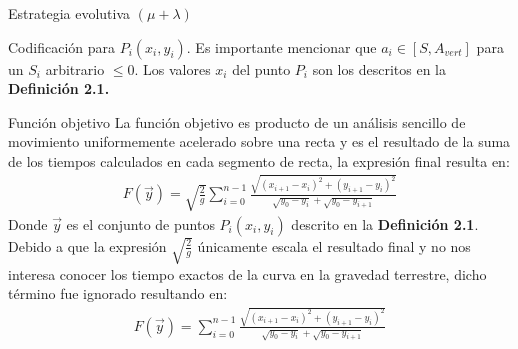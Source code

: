 \documentclass[10pt, letterpaper]{article}
\theoremstyle{definition}
\begin{document}
\begin{section}{Estrategia evolutiva $(\mu + \lambda)$}
\begin{subsection}{Codificación}
        para $P_i(x_i, y_i)$. Es importante mencionar que $a_i \in [S, A_{vert}]$
        para un $S_i$ arbitrario $\leq 0$. Los valores $x_i$ del punto $P_i$ son los descritos
        en la \textbf{Definición 2.1.}
    \end{subsection}
    \begin{subsection}{Función objetivo}
        La función objetivo es producto de un análisis sencillo de movimiento
        uniformemente acelerado sobre una recta y es el resultado de la suma
        de los tiempos calculados en cada segmento de recta, la expresión final
        resulta en:
        \begin{equation} \begin{gathered}
            F(\vec{y}) = \sqrt{\frac{2}{g}} \sum_{i=0}^{n-1}
                \frac
                    {\sqrt{(x_{i+1} - x_{i})^2 + (y_{i+1} - y_i)^2}}
                    {\sqrt{y_0 - y_i} + \sqrt{y_0 - y_{i+1}}}
        \end{gathered} \end{equation}
        Donde $\vec{y}$ es el conjunto de puntos $P_i(x_i, y_i)$ descrito en la
        \textbf{Definición 2.1}.\\

        Debido a que la expresión $\sqrt{\frac{2}{g}}$ únicamente escala el
        resultado final y no nos interesa conocer los tiempo exactos de la curva
        en la gravedad terrestre, dicho término fue ignorado resultando en:
        \begin{equation} \begin{gathered}
            F(\vec{y}) = \sum_{i=0}^{n-1}
                \frac
                    {\sqrt{(x_{i+1} - x_{i})^2 + (y_{i+1} - y_i)^2}}
                    {\sqrt{y_0 - y_i} + \sqrt{y_0 - y_{i+1}}}
        \end{gathered} \end{equation}
    \end{subsection}
\end{section}
\end{document}

